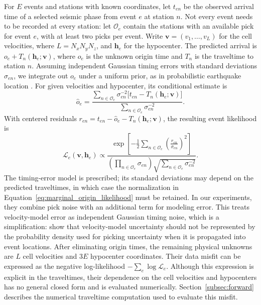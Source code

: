\documentclass[12pt, a4paper]{article}
\begin{document}
For $E$ events and stations with known coordinates, let $t_{en}$ be the observed arrival time of a selected seismic phase from event $e$ at station $n$. Not every event needs to be recorded at every station: let $\mathcal O_e$ contain the stations with an available pick for event $e$, with at least two picks per event. Write $\mathbf v=(v_1,\ldots,v_L)$ for the cell velocities, where $L=N_xN_yN_z$, and $\mathbf h_e$ for the hypocenter. The predicted arrival is $o_e+T_n(\mathbf h_e;\mathbf v)$, where $o_e$ is the unknown origin time and $T_n$ is the traveltime to station $n$. Assuming independent Gaussian timing errors with standard deviations $\sigma_{en}$, we integrate out $o_e$ under a uniform prior, as in probabilistic earthquake location \parencite{lomax2000}. For given velocities and hypocenter, its conditional estimate is
\begin{equation}
\widehat o_e=\frac{\sum_{n\in\mathcal O_e}\sigma_{en}^{-2}\bigl[t_{en}-T_n(\mathbf h_e;\mathbf v)\bigr]}{\sum_{n\in\mathcal O_e}\sigma_{en}^{-2}}.
\label{eq:origin_time_estimate}
\end{equation}
With centered residuals $r_{en}=t_{en}-\widehat o_e-T_n(\mathbf h_e;\mathbf v)$, the resulting event likelihood is
\begin{equation}
\mathcal L_e(\mathbf v,\mathbf h_e)\propto
\frac{\exp\!\left[-\tfrac12\sum_{n\in\mathcal O_e}\left(\frac{r_{en}}{\sigma_{en}}\right)^2\right]}
{\left(\prod_{n\in\mathcal O_e}\sigma_{en}\right)\sqrt{\sum_{n\in\mathcal O_e}\sigma_{en}^{-2}}}.
\label{eq:marginal_origin_likelihood}
\end{equation}
The timing-error model is prescribed; its standard deviations may depend on the predicted traveltimes, in which case the normalization in Equation~\ref{eq:marginal_origin_likelihood} must be retained. In our experiments, they combine pick noise with an additional term for modeling error. This treats velocity-model error as independent Gaussian timing noise, which is a simplification: \textcite{gesret2015} show that velocity-model uncertainty should not be represented by the probability density used for picking uncertainty when it is propagated into event locations. After eliminating origin times, the remaining physical unknowns are $L$ cell velocities and $3E$ hypocenter coordinates. Their data misfit can be expressed as the negative log-likelihood $-\sum_e\log\mathcal L_e$. Although this expression is explicit in the traveltimes, their dependence on the cell velocities and hypocenters has no general closed form and is evaluated numerically. Section~\ref{subsec:forward} describes the numerical traveltime computation used to evaluate this misfit.
\end{document}
